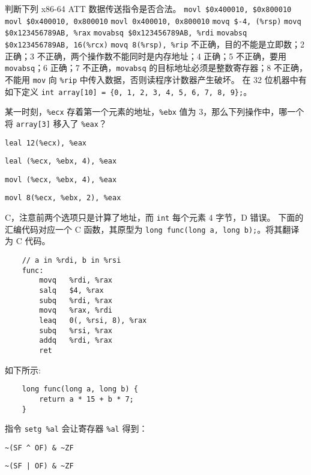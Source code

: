 \begin{problems}
        \pro 判断下列 x86-64 ATT 数据传送指令是否合法。
            \qn \verb|movl $0x400010, $0x800010|
            \qn \verb|movl $0x400010, 0x800010|
            \qn \verb|movl 0x400010, 0x800010|
            \qn \verb|movq $-4, (%rsp)|
            \qn \verb|movq $0x123456789AB, %rax|
            \qn \verb|movabsq $0x123456789AB, %rdi|
            \qn \verb|movabsq $0x123456789AB, 16(%rcx)|
            \qn \verb|movq 8(%rsp), %rip|
         不正确，目的不能是立即数；2 正确；3 不正确，两个操作数不能同时是内存地址；4 正确；5 不正确，要用 \verb|movabsq|；6 正确；7 不正确，\verb|movabsq| 的目标地址必须是整数寄存器；8 不正确，不能用 \verb|mov| 向 \verb|%rip| 中传入数据，否则读程序计数器产生破坏。
        \pro 在 32 位机器中有如下定义 \texttt{int array[10] = \{0, 1, 2, 3, 4, 5, 6, 7, 8, 9\};}。
        
        某一时刻，\verb|%ecx| 存着第一个元素的地址，\verb|%ebx| 值为 3，那么下列操作中，哪一个将 \verb|array[3]| 移入了 \verb|%eax|？
        \begin{choices}
            \item \verb|leal 12(%ecx), %eax|
            \item \verb|leal (%ecx, %ebx, 4), %eax|
            \item \verb|movl (%ecx, %ebx, 4), %eax|
            \item \verb|movl 8(%ecx, %ebx, 2), %eax|
        \end{choices}
        \sol C，注意前两个选项只是计算了地址，而 \verb|int| 每个元素 4 字节，D 错误。
        \pro 下面的汇编代码对应一个 C 函数，其原型为 \verb|long func(long a, long b);|。将其翻译为 C 代码。
        \begin{verbatim}
    // a in %rdi, b in %rsi
    func:
        movq   %rdi, %rax
        salq   $4, %rax
        subq   %rdi, %rax
        movq   %rax, %rdi
        leaq   0(, %rsi, 8), %rax
        subq   %rsi, %rax
        addq   %rdi, %rax
        ret
        \end{verbatim}
        \sol 如下所示:
        \begin{verbatim}
    long func(long a, long b) {
        return a * 15 + b * 7;
    }
        \end{verbatim}
        \pro 指令 \verb|setg %al| 会让寄存器 \verb|%al| 得到：
        \begin{choices}
            \item \verb+~(SF ^ OF) & ~ZF+
            \item \verb+~(SF | OF) & ~ZF+

\end{choices}
\end{problems}

